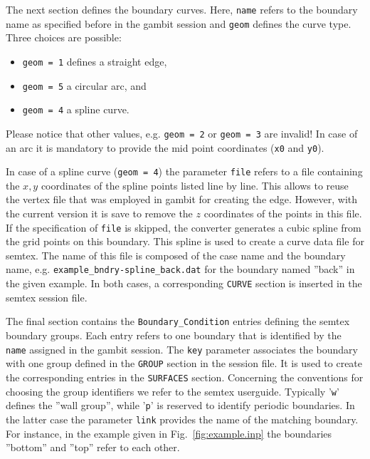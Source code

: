 \documentclass{article}
\begin{document}
The next section defines the boundary curves. 
Here, \texttt{name} refers to the boundary name as specified before in
the gambit session and \texttt{geom} defines the curve type. 
Three choices are possible:
\begin{itemize}
\item \texttt{geom = 1} \quad defines a straight edge,
\item \texttt{geom = 5} \quad a circular arc, and 
\item \texttt{geom = 4} \quad a spline curve.
\end{itemize}
Please notice that other values, e.g. \texttt{geom = 2} or \texttt{geom = 3} 
are invalid!
In case of an arc it is mandatory to provide the
mid point coordinates (\texttt{x0} and \texttt{y0}).

In case of a spline curve (\texttt{geom = 4}) the parameter \texttt{file}
refers to a file containing the $x,y$ coordinates of the spline points
listed line by line. This allows to reuse the vertex file that was
employed in gambit for creating the edge.
However, with the current version it is save to remove the $z$ coordinates 
of the points in this file.
If the specification of \texttt{file} is skipped, the converter generates
a cubic spline from the grid points on this boundary. This spline is used
to create a curve data file for semtex. 
The name of this file is composed of the case name and the boundary name,
e.g. \verb|example_bndry-spline_back.dat| for the boundary named ''back''
in the given example. 
In both cases, a corresponding \verb|CURVE| section is inserted in the
semtex session file.

The final section contains the \verb|Boundary_Condition| entries defining
the semtex boundary groups. Each entry refers to one boundary that is
identified by the \texttt{name} assigned in the gambit session.
The \texttt{key} parameter associates the boundary with one group defined in 
the \texttt{GROUP} section in the session file. It is used to create the
corresponding entries in the \texttt{SURFACES} section. 
Concerning the conventions for choosing the group identifiers we refer to
the semtex userguide. 
Typically  
'\texttt{w}' defines the ''wall group'', while
'\texttt{p}' is reserved to identify periodic boundaries.
In the latter case the parameter \texttt{link} provides the
name of the matching boundary. For instance, in the example given in 
Fig.~\ref{fig:example.inp} the boundaries ''bottom'' and ''top'' refer
to each other.

\end{document}
